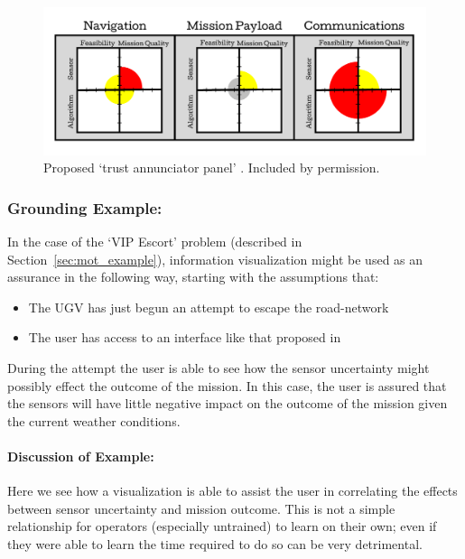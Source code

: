 \begin{figure}[htpb]
    \centering
    \includegraphics[width=0.7\linewidth]{Figures/Hutchins_fig.pdf}
    \caption{Proposed `trust annunciator panel' \cite{Hutchins2015-if}. Included by permission.}
    \label{fig:hutchins_fig}
\end{figure}

\subsubsection{Grounding Example:}
In the case of the `VIP Escort' problem (described in Section~\ref{sec:mot_example}), information visualization might be used as an assurance in the following way, starting with the assumptions that:

\begin{itemize}
    \item The UGV has just begun an attempt to escape the road-network
    \item The user has access to an interface like that proposed in \cite{Hutchins2015-if}
\end{itemize}

During the attempt the user is able to see how the sensor uncertainty might possibly effect the outcome of the mission. In this case, the user is assured that the sensors will have little negative impact on the outcome of the mission given the current weather conditions.

\paragraph{\textbf{Discussion of Example:}} Here we see how a visualization is able to assist the user in correlating the effects between sensor uncertainty and mission outcome. This is not a simple relationship for operators (especially untrained) to learn on their own; even if they were able to learn the time required to do so can be very detrimental.
